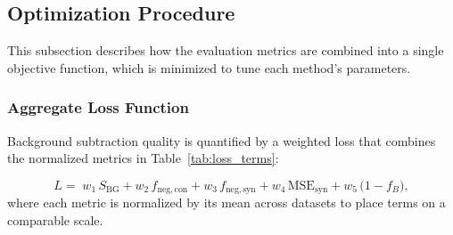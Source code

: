 \documentclass[iucr]{iucrjournals}
\begin{document}
\subsection{Optimization Procedure}


This subsection describes how the evaluation metrics are combined into a single objective function, which is minimized to tune each method's parameters.

\subsubsection{Aggregate Loss Function}


Background subtraction quality is quantified by a weighted loss that combines the normalized metrics in Table~\ref{tab:loss_terms}:

\begin{equation}
L =\;
w_1\, S_{\mathrm{BG}}
+ w_2\, f_{\mathrm{neg,con}}
+ w_3\, f_{\mathrm{neg,syn}}
+ w_4\, \mathrm{MSE}_{\mathrm{syn}}
+ w_5\, \bigl(1 - f_{B}\bigr),
\end{equation}
where each metric is normalized by its mean across datasets to place terms on a comparable scale.

\end{document}
